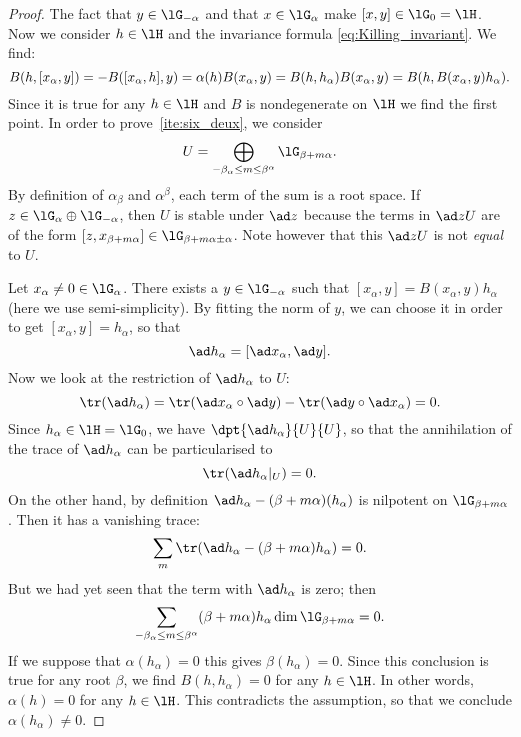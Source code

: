 \begin{proof}
	The fact that $y\in\lG_{-\alpha}$ and that $x\in\lG_{\alpha}$ make $[x,y]\in\lG_0=\lH$. Now we consider $h\in\lH$ and the invariance formula \eqref{eq:Killing_invariant}. We find:
	\begin{equation}
		B(h,[x_{\alpha},y])=-B([x_{\alpha},h],y)\\
		=\alpha(h)B(x_{\alpha},y)\\
		=B(h,h_{\alpha})B(x_{\alpha},y)\\
		=B(h,B(x_{\alpha},y)h_{\alpha}).
	\end{equation}
	Since it is true for any $h\in\lH$ and $B$ is nondegenerate on $\lH$ we find the first point. In order to prove~\ref{ite:six_deux}, we consider
	\[
		U=\bigoplus_{-\beta_{\alpha}\leq m\leq\beta^{\alpha}}\lG_{\beta+m\alpha}.
	\]
	By definition of $\alpha_{\beta}$ and $\alpha^{\beta}$, each term of the sum is a root space. If $z\in\lG_{\alpha}\oplus\lG_{-\alpha}$, then $U$ is stable under $\ad z$ because the terms in $\ad z U$ are of the form $[z,x_{\beta+m\alpha}]\in\lG_{\beta+m\alpha\pm\alpha}$. Note however that this $\ad z U$ is not \emph{equal} to $U$.

	Let $x_{\alpha}\neq 0\in\lG_{\alpha}$. There exists a $y\in\lG_{-\alpha}$ such that $[x_{\alpha},y]=B(x_{\alpha},y)h_{\alpha}$ (here we use semi-simplicity). By fitting the norm of $y$, we can choose it in order to get  $[x_{\alpha},y]=h_{\alpha}$, so that
	\[
		\ad h_{\alpha}=[\ad x_{\alpha},\ad y].
	\]
	Now we look at the restriction of $\ad h_{\alpha}$ to $U$:
	\begin{equation}
		\tr(\ad h_{\alpha})=\tr(\ad x_{\alpha}\circ\ad y)-\tr(\ad y\circ\ad x_{\alpha})=0.
	\end{equation}
	Since $h_{\alpha}\in\lH=\lG_0$, we have $\dpt{\ad h_{\alpha}}{U}{U}$, so that the annihilation of the trace of $\ad h_{\alpha}$ can be particularised to
	\[
		\tr(\ad h_{\alpha}|_U)=0.
	\]
	On the other hand, by definition $\ad h_{\alpha}-(\beta+m\alpha)(h_{\alpha})$ is nilpotent on $\lG_{\beta+m\alpha}$. Then it has a vanishing trace:
	\[
		\sum_m\tr( \ad h_{\alpha}-(\beta+m\alpha)h_{\alpha}  )=0.
	\]
	But we had yet seen that the term with $\ad h_{\alpha}$ is zero; then
	\begin{equation}\label{eq:trace_U}
		\sum_{-\beta_{\alpha}\leq m\leq \beta^{\alpha}} (\beta+m\alpha)h_{\alpha}\dim\lG_{\beta+m\alpha}=0.
	\end{equation}
	If we suppose that $\alpha(h_{\alpha})=0$ this gives $\beta(h_{\alpha})=0$. Since this conclusion is true for any root $\beta$, we find $B(h,h_{\alpha})=0$ for any $h\in\lH$. In other words, $\alpha(h)=0$ for any $h\in\lH$. This contradicts the assumption, so that we conclude $\alpha(h_{\alpha})\neq 0$.



\end{proof}
